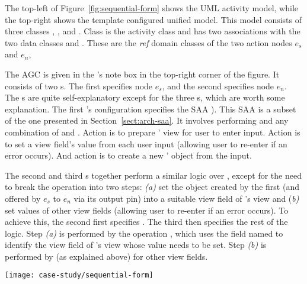 The top-left of Figure~\ref{fig:sequential-form} shows the UML activity model, while the top-right shows the template configured unified model.
This model consists of three classes , , and . Class  is the activity class and has two associations with the two data classes  and . These are the \textit{ref} domain classes of the two action nodes $ e_s $ and $ e_n $, \resp

The AGC is given in the 's note box in the top-right corner of the figure. It consists of two s. The first  specifies node $ e_s $, and the second specifies node $ e_n $. The s are quite self-explanatory except for the three s, which are worth some explanation. The first 's configuration specifies the SAA ). This SAA is a subset of the one presented in Section~\ref{sect:arch-saa}. It involves performing  and any combination of  and . Action  is to prepare ' view for user to enter input. Action  is to set a view field's value from each user input (allowing user to re-enter if an error occurs). And action  is to create a new ' object from the input.

The second and third s together perform a similar logic over , except for the need to break the  operation into two steps: \textit{(a)} set the  object created by the first  (and offered by $ e_s $ to $ e_n $ via its output pin) into a suitable view field of 's view and (\textit{b)} set values of other view fields (allowing user to re-enter if an error occurs). To achieve this, the second  first specifies . The third  then specifies the rest of the logic. Step \textit{(a)} is performed by the operation , which uses the field named  to identify the view field of 's view whose value needs to be set. Step \textit{(b)} is performed by  (as explained above) for other view fields.

\begin{figure*}[ht]
	\begin{center}
		\texttt{[image: case-study/sequential-form]}
	\end{center}
	\caption{The sequential pattern form.} %
	\label{fig:sequential-form}
\end{figure*}

